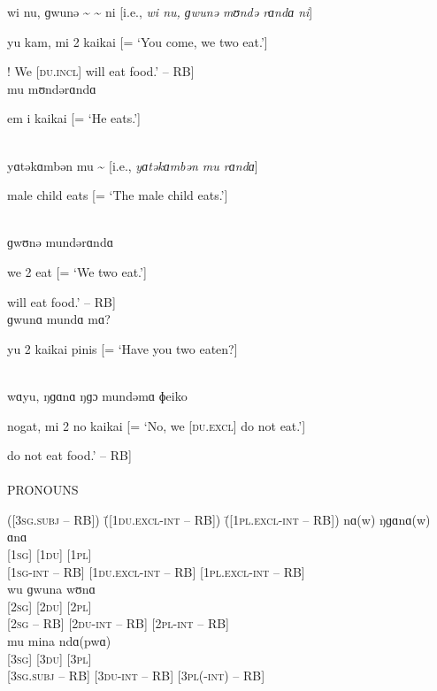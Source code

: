 \noindent wi nu, ɡwunə {\textasciitilde} {\textasciitilde} ni [i.e., \textit{wi nu, ɡwunə mʊndə rɑndɑ ni}]

\noindent yu kam, mi 2 kaikai [= ‘You come, we two eat.’]

\noindent [‘Come [\textsc{sg}]! We [\textsc{du.incl}] will eat food.’ -- RB]\\

\noindent mu mʊndərɑndɑ

\noindent em i kaikai [= ‘He eats.’]

\\

\noindent yɑtəkɑmbən mu {\textasciitilde} [i.e., \textit{yɑtəkɑmbən mu rɑndɑ}]

\noindent male child eats [= ‘The male child eats.’]

\\

\noindent ɡwʊnə mundərɑndɑ

\noindent we 2 eat [= ‘We two eat.’]

\noindent [‘We [\textsc{du.incl}] will eat food.’ -- RB]\\

\noindent ɡwunɑ mundɑ mɑ?

\noindent yu 2 kaikai pinis [= ‘Have you two eaten?]

\\

\noindent wɑyu, ŋɡɑnɑ ŋɡɔ mundəmɑ ɸeiko

\noindent nogat, mi 2 no kaikai [= ‘No, we [\textsc{du.excl}] do not eat.’]

\noindent [‘No, we [\textsc{du.excl}] do not eat food.’ -- RB]\\

\\

\noindent PRONOUNS

\begin{tabbing}
{([\textsc{3sg.subj} -- RB])} \= {([\textsc{1du.excl-int} -- RB])} \= {([\textsc{1pl.excl-int} -- RB])}\kill
nɑ(w) \> ŋɡɑnɑ(w) \> ɑnɑ\\
\textsc{[1sg]} \> \textsc{[1du]} \> \textsc{[1pl]}\\
{[\textsc{1sg-int} -- RB]} \> {[\textsc{1du.excl-int} -- RB]} \> {[\textsc{1pl.excl-int} -- RB]}\\
wu \> ɡwuna \> wʊnɑ\\
\textsc{[2sg]} \> \textsc{[2du]} \> \textsc{[2pl]}\\
{[\textsc{2sg} -- RB]} \> {[\textsc{2du-int} -- RB]} \> {[\textsc{2pl-int} -- RB]}\\
mu \> mina \> ndɑ(pwɑ)\\
\textsc{[3sg]} \> \textsc{[3du]} \> \textsc{[3pl]}\\
{[\textsc{3sg.subj} -- RB]} \> {[\textsc{3du-int} -- RB]} \> {[\textsc{3pl(-int)} -- RB]}
\end{tabbing}

